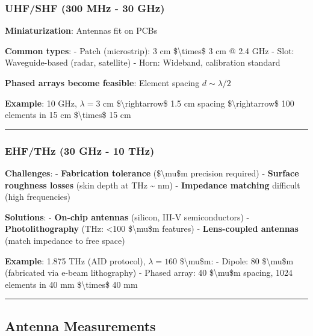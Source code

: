 \subsubsection{UHF/SHF (300 MHz - 30
GHz)}\label{uhfshf-300-mhz---30-ghz}

\textbf{Miniaturization}: Antennas fit on PCBs

\textbf{Common types}: - Patch (microstrip): 3 cm
\$\textbackslash times\$ 3 cm @ 2.4 GHz - Slot: Waveguide-based (radar,
satellite) - Horn: Wideband, calibration standard

\textbf{Phased arrays become feasible}: Element spacing
\(d \sim \lambda/2\)

\textbf{Example}: 10 GHz, \(\lambda = 3\) cm
\$\textbackslash rightarrow\$ 1.5 cm spacing
\$\textbackslash rightarrow\$ 100 elements in 15 cm
\$\textbackslash times\$ 15 cm

\begin{center}\rule{0.5\linewidth}{0.5pt}\end{center}

\subsubsection{EHF/THz (30 GHz - 10 THz)}\label{ehfthz-30-ghz---10-thz}

\textbf{Challenges}: - \textbf{Fabrication tolerance}
(\$\textbackslash mu\$m precision required) - \textbf{Surface roughness
losses} (skin depth at THz \textasciitilde{} nm) - \textbf{Impedance
matching} difficult (high frequencies)

\textbf{Solutions}: - \textbf{On-chip antennas} (silicon, III-V
semiconductors) - \textbf{Photolithography} (THz: \textless100
\$\textbackslash mu\$m features) - \textbf{Lens-coupled antennas} (match
impedance to free space)

\textbf{Example}: 1.875 THz (AID protocol), \(\lambda = 160\)
\$\textbackslash mu\$m: - Dipole: 80 \$\textbackslash mu\$m (fabricated
via e-beam lithography) - Phased array: 40 \$\textbackslash mu\$m
spacing, 1024 elements in 40 mm \$\textbackslash times\$ 40 mm

\begin{center}\rule{0.5\linewidth}{0.5pt}\end{center}

\subsection{Antenna Measurements}\label{antenna-measurements}

